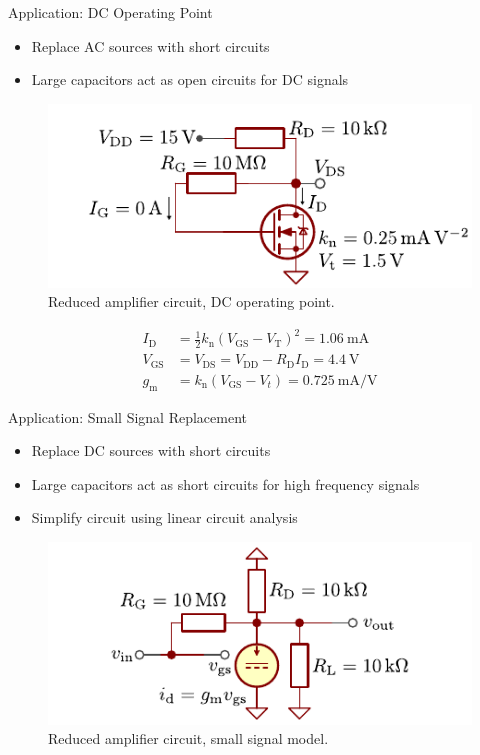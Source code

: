 \begin{frame}{Application: DC Operating Point}
    \begin{itemize}
        \item Replace AC sources with short circuits
        \item Large capacitors act as open circuits for DC signals
    \end{itemize}
    \begin{figure}
        \centering
        \includegraphics{../assets/example_circuit_dc.pdf}
        \caption{Reduced amplifier circuit, DC operating point.}
        \label{fig:mosfet_amplifier_dc}
    \end{figure}
    \begin{align*}
        I_{\mathrm{D}}&=\frac{1}{2}k_{\mathrm{n}}(V_{\mathrm{GS}}-V_{\mathrm{T}})^{2} 
        = \qty{1.06}{\milli \ampere}\\
        V_{\mathrm{GS}}&=V_{\mathrm{DS}}=V_{\mathrm{DD}}-R_{\mathrm{D}}I_{\mathrm{D}}
        =\qty{4.4}{\volt} \\
        g_\mathrm{m} &= k_\mathrm{n} (V_\mathrm{GS}-V_t) = \qty{0.725}{\milli \ampere \per \volt}
    \end{align*}
\end{frame}

\begin{frame}{Application: Small Signal Replacement}
    \begin{itemize}
        \item Replace DC sources with short circuits
        \item Large capacitors act as short circuits for high frequency signals
        \item Simplify circuit using linear circuit analysis
    \end{itemize}
    \begin{figure}
        \centering
        \includegraphics{../assets/mosfet_amplifier_small_signal.pdf}
        \caption{Reduced amplifier circuit, small signal model.}
        \label{fig:mosfet_amplifier_ac}
    \end{figure}
\end{frame}

